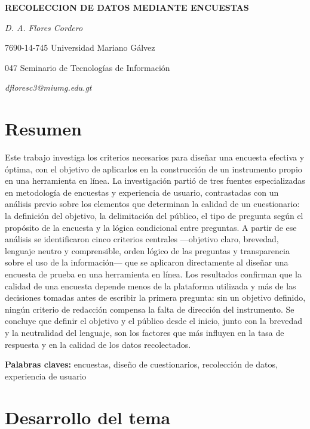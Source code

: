 \documentclass[
  spanish,
  12pt,
  letterpaper,
]{article}
\author{}
\date{}
\begin{document}
\begin{center}

\textbf{RECOLECCION DE DATOS MEDIANTE ENCUESTAS}

\emph{D. A. Flores Cordero}

7690-14-745 Universidad Mariano Gálvez

047 Seminario de Tecnologías de Información

\emph{dfloresc3@miumg.edu.gt}

\end{center}

\section{Resumen}\label{resumen}

Este trabajo investiga los criterios necesarios para diseñar una
encuesta efectiva y óptima, con el objetivo de aplicarlos en la
construcción de un instrumento propio en una herramienta en línea. La
investigación partió de tres fuentes especializadas en metodología de
encuestas y experiencia de usuario, contrastadas con un análisis previo
sobre los elementos que determinan la calidad de un cuestionario: la
definición del objetivo, la delimitación del público, el tipo de
pregunta según el propósito de la encuesta y la lógica condicional entre
preguntas. A partir de ese análisis se identificaron cinco criterios
centrales ---objetivo claro, brevedad, lenguaje neutro y comprensible,
orden lógico de las preguntas y transparencia sobre el uso de la
información--- que se aplicaron directamente al diseñar una encuesta de
prueba en una herramienta en línea. Los resultados confirman que la
calidad de una encuesta depende menos de la plataforma utilizada y más
de las decisiones tomadas antes de escribir la primera pregunta: sin un
objetivo definido, ningún criterio de redacción compensa la falta de
dirección del instrumento. Se concluye que definir el objetivo y el
público desde el inicio, junto con la brevedad y la neutralidad del
lenguaje, son los factores que más influyen en la tasa de respuesta y en
la calidad de los datos recolectados.

\textbf{Palabras claves:} encuestas, diseño de cuestionarios,
recolección de datos, experiencia de usuario

\section{Desarrollo del tema}\label{desarrollo-del-tema}
\end{document}
